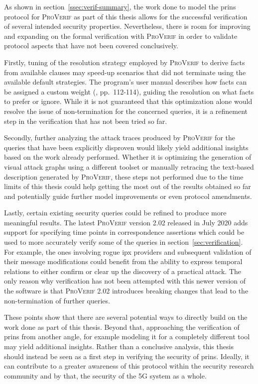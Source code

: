 As shown in section~\ref{ssec:verif-summary}, the work done to model the \gls{prins} protocol for \textsc{ProVerif} as part of this thesis allows for the successful verification of several intended security properties.
Nevertheless, there is room for improving and expanding on the formal verification with \textsc{ProVerif} in order to validate protocol aspects that have not been covered conclusively.

Firstly, tuning of the resolution strategy employed by \textsc{ProVerif} to derive facts from available clauses may speed-up scenarios that did not terminate using the available default strategies.
The program's user manual describes how facts can be assigned a custom weight (\cite{blanchet2020proverif}, pp.~112-114), guiding the resolution on what facts to prefer or ignore.
While it is not guaranteed that this optimization alone would resolve the issue of non-termination for the concerned queries, it is a refinement step in the verification that has not been tried so far.

Secondly, further analyzing the attack traces produced by \textsc{ProVerif} for the queries that have been explicitly disproven would likely yield additional insights based on the work already performed.
Whether it is optimizing the generation of visual attack graphs using a different toolset or manually retracing the text-based description generated by \textsc{ProVerif}, these steps not performed due to the time limits of this thesis could help getting the most out of the results obtained so far and potentially guide further model improvements or even protocol amendments.

Lastly, certain existing security queries could be refined to produce more meaningful results.
The latest \textsc{ProVerif} version 2.02 released in July 2020 adds support for specifying time points in correspondence assertions which could be used to more accurately verify some of the queries in section~\ref{sec:verification}.
For example, the ones involving rogue \gls{ipx} providers and subsequent validation of their message modifications could benefit from the ability to express temporal relations to either confirm or clear up the discovery of a practical attack.
The only reason why verification has not been attempted with this newer version of the software is that \textsc{ProVerif} 2.02 introduces breaking changes that lead to the non-termination of further queries.

These points show that there are several potential ways to directly build on the work done as part of this thesis.
Beyond that, approaching the verification of \gls{prins} from another angle, for example modeling it for a completely different tool may yield additional insights.
Rather than a conclusive analysis, this thesis should instead be seen as a first step in verifying the security of \gls{prins}.
Ideally, it can contribute to a greater awareness of this protocol within the security research community and by that, the security of the 5G system as a whole.